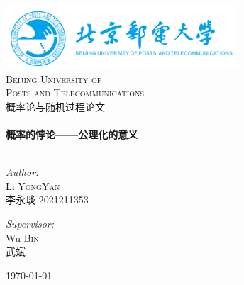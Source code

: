 \begin{titlepage}

    \begin{center}


        \includegraphics[width=0.65\textwidth]{figure/logo}\\[1cm]

        \textsc{\LARGE Beijing University of}\\[1.5cm]

        \textsc{\LARGE Posts and Telecommunications}\\[1.5cm]


        \textsc{\Large 概率论与随机过程论文}\\[0.5cm]


        \HRule \\[0.6cm]
        { \huge \bfseries 概率的悖论——公理化的意义}\\[0.4cm]

        \HRule \\[1.0cm]

        \begin{minipage}{0.4\textwidth}
            \begin{flushleft} \large
                \emph{Author:}\\
                Li \textsc{YongYan} \\
                李永琰 2021211353
            \end{flushleft}
        \end{minipage}
        \begin{minipage}{0.4\textwidth}
            \begin{flushright} \large
                \emph{Supervisor:} \\
                Wu \textsc{Bin} \\
                武斌
            \end{flushright}
        \end{minipage}

        \vfill

        {\large \today}

    \end{center}

\end{titlepage}